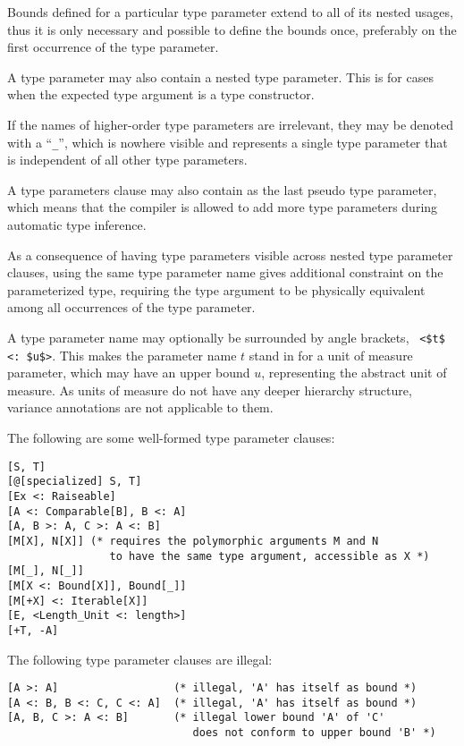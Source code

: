 Bounds defined for a particular type parameter extend to all of its nested usages, thus it is only necessary and possible to define the bounds once, preferably on the first occurrence of the type parameter. 

A type parameter may also contain a nested type parameter. This is for cases when the expected type argument is a type constructor. 

If the names of higher-order type parameters are irrelevant, they may be denoted with a ``\lstinline!_!'', which is nowhere visible and represents a single type parameter that is independent of all other type parameters. 

A type parameters clause may also contain \code{*} as the last pseudo type parameter, which means that the compiler is allowed to add more type parameters during automatic type inference. 

As a consequence of having type parameters visible across nested type parameter clauses, using the same type parameter name gives additional constraint on the parameterized type, requiring the type argument to be physically equivalent among all occurrences of the type parameter. 

A type parameter name may optionally be surrounded by angle brackets, ~\lstinline!<$t$ <: $u$>!. This makes the parameter name $t$ stand in for a unit of measure parameter, which may have an upper bound $u$, representing the abstract unit of measure. As units of measure do not have any deeper hierarchy structure, variance annotations are not applicable to them. 

\example The following are some well-formed type parameter clauses:
\begin{lstlisting}
[S, T]
[@[specialized] S, T]
[Ex <: Raiseable]
[A <: Comparable[B], B <: A]
[A, B >: A, C >: A <: B]
[M[X], N[X]] (* requires the polymorphic arguments M and N 
                to have the same type argument, accessible as X *)
[M[_], N[_]]
[M[X <: Bound[X]], Bound[_]]
[M[+X] <: Iterable[X]]
[E, <Length_Unit <: length>]
[+T, -A]
\end{lstlisting}
The following type parameter clauses are illegal:
\begin{lstlisting}
[A >: A]                  (* illegal, 'A' has itself as bound *)
[A <: B, B <: C, C <: A]  (* illegal, 'A' has itself as bound *)
[A, B, C >: A <: B]       (* illegal lower bound 'A' of 'C'
                             does not conform to upper bound 'B' *)
\end{lstlisting}





